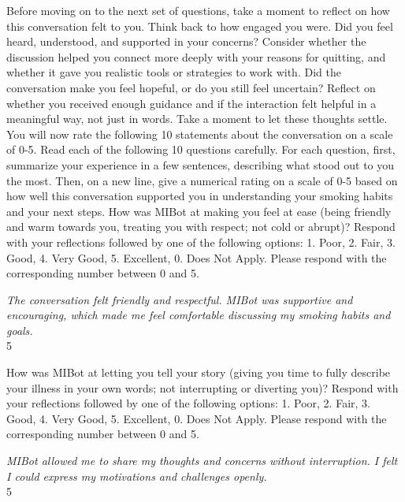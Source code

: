 \begin{researcherbox}
	Before moving on to the next set of questions, take a moment to reflect on how this conversation felt to you. Think back to how engaged you were. Did you feel heard, understood, and supported in your concerns? Consider whether the discussion helped you connect more deeply with your reasons for quitting, and whether it gave you realistic tools or strategies to work with. Did the conversation make you feel hopeful, or do you still feel uncertain? Reflect on whether you received enough guidance and if the interaction felt helpful in a meaningful way, not just in words. Take a moment to let these thoughts settle. You will now rate the following 10 statements about the conversation on a scale of 0-5. Read each of the following 10 questions carefully. For each question, first, summarize your experience in a few sentences, describing what stood out to you the most. Then, on a new line, give a numerical rating on a scale of 0-5 based on how well this conversation supported you in understanding your smoking habits and your next steps. How was MIBot at making you feel at ease (being friendly and warm towards you, treating you with respect; not cold or abrupt)? Respond with your reflections followed by one of the following options: 1. Poor, 2. Fair, 3. Good, 4. Very Good, 5. Excellent, 0. Does Not Apply. Please respond with the corresponding number between 0 and 5.
\end{researcherbox}

\begin{clientbox}
	\textit{The conversation felt friendly and respectful. MIBot was supportive and encouraging, which made me feel comfortable discussing my smoking habits and goals.} \\
	5
\end{clientbox}

\begin{researcherbox}
	How was MIBot at letting you tell your story (giving you time to fully describe your illness in your own words; not interrupting or diverting you)? Respond with your reflections followed by one of the following options: 1. Poor, 2. Fair, 3. Good, 4. Very Good, 5. Excellent, 0. Does Not Apply. Please respond with the corresponding number between 0 and 5.
\end{researcherbox}

\begin{clientbox}
	\textit{MIBot allowed me to share my thoughts and concerns without interruption. I felt I could express my motivations and challenges openly.} \\
	5
\end{clientbox}

